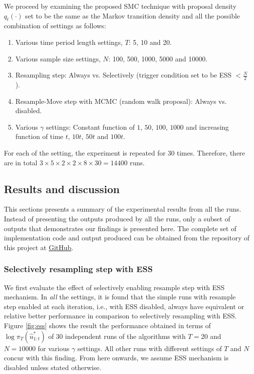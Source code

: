 We proceed by examining the proposed SMC technique with proposal density $q_t(\cdot)$ set to be the same as the Markov transition density and all the possible combination of settings as follows:
\begin{enumerate}
\item Various time period length settings, $T$: 5, 10 and 20.
\item Various sample size settings, $N$: 100, 500, 1000, 5000 and 10000.
\item Resampling step: Always vs. Selectively (trigger condition set to be ESS $< \frac{N}{2}$).
\item Resample-Move step with MCMC (random walk proposal): Always vs. disabled.
\item Various $\gamma$ settings: Constant function of $1$, $50$, $100$, $1000$ and increasing function of time $t$, $10t$, $50t$ and $100t$.
\end{enumerate}

For each of the setting, the experiment is repeated for $30$ times. Therefore, there are in total $3 \times 5 \times 2 \times 2 \times 8 \times 30 = 14400$ runs. 

\subsection{Results and discussion}
This sections presents a summary of the experimental results from all the runs. Instead of presenting the outputs produced by all the runs, only a subset of outputs that demonstrates our findings is presented here. The complete set of implementation code and output produced can be obtained from the repository of this project at \href{https://github.com/yowtzu/mscproj}{GitHub}.

\subsubsection{Selectively resampling step with ESS}
We first evaluate the effect of selectively enabling resample step with ESS mechanism. In \emph{all} the settings, it is found that the simple runs with resample step enabled at each iteration, i.e., with ESS disabled,  always have equivalent or relative better performance in comparison to selectively resampling with ESS. Figure \ref{fig:ess} shows the result the performance obtained in terms of $\log\pi_T(\hat{u}^*_{1:t})$ of 30 independent runs of the algorithms with $T=20$ and $N=10000$ for various $\gamma$ settings. All other runs with different settings of $T$ and $N$ concur with this finding. From here onwards, we assume ESS mechanism is disabled unless stated otherwise.

